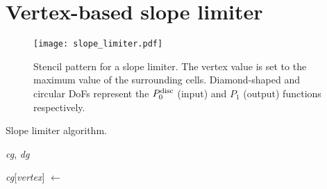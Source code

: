 \documentclass[thesis]{subfiles}
\begin{document}








\section{Vertex-based slope limiter}

\begin{figure}
  \centering
  \texttt{[image: slope\_limiter.pdf]}
  \caption{
    Stencil pattern for a slope limiter.
    The vertex value is set to the maximum value of the surrounding cells.
    Diamond-shaped and circular DoFs represent the $P_0^\textnormal{disc}$ (input) and $P_1$ (output) functions respectively.
  }
  \label{fig:slope_limiter_stencil}
\end{figure}

\begin{algorithm}
  \caption{
    Slope limiter algorithm.
  }
  \begin{algorithmic}[1]
    \Require \textit{cg}, \textit{dg} 

       
        \State \textit{cg}[\textit{vertex}] $\gets$ 
      \EndFor
    \EndFor
  \end{algorithmic}
  \label{alg:slope_limiter}
\end{algorithm}
\end{document}
